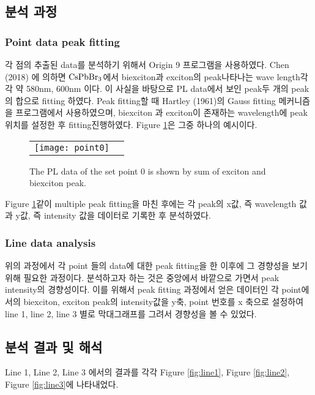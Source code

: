 \subsection{분석 과정}
\subsubsection{Point data peak fitting}
각 점의 추출된 data를 분석하기 위해서 Origin 9 프로그램을 사용하였다. Chen (2018) 에 의하면 $\rm CsPbBr_3$에서 biexciton과 exciton의 peak\이 나타나는 wave length\는 각각 약 580nm, 600nm 이다\cite{chen2018room}. 이 사실을 바탕으로 PL data에서 보인 peak\을 두 개의 peak의 합으로 fitting 하였다. Peak fitting\을 할 때 Hartley (1961)의 Gauss fitting 메커니즘을 프로그램에서 사용하였으며, biexciton 과 exciton이 존재하는 wavelength에 peak 위치를 설정한 후 fitting\을 진행하였다\cite{hartley1961modified}. Figure \ref{fig:point0}은 그중 하나의 예시이다.

\begin{figure}[H]
	\begin{center}
		\begin{tabular}{cc}
			\texttt{[image: point0]}
		\end{tabular}
	\end{center}
	\caption{The PL data of the set point 0 is shown by sum of exciton and biexciton peak.}
	\label{fig:point0}  
\end{figure}

Figure \ref{fig:point0}\과 같이 multiple peak fitting을 마친 후에는 각 peak의 x값, 즉 wavelength 값과 y값, 즉 intensity 값을 데이터로 기록한 후 분석하였다.

\subsubsection{Line data analysis}
위의 과정에서 각 point 들의 data에 대한 peak fitting을 한 이후에 그 경향성을 보기 위해 필요한 과정이다. 분석하고자 하는 것은 중앙에서 바깥으로 가면서 peak intensity의 경향성이다. 이를 위해서 peak fitting 과정에서 얻은 데이터인 각 point에서의 biexciton, exciton peak의 intensity값을 y축, point 번호를 x 축으로 설정하여  line 1, line 2, line 3 별로 막대그래프를 그려서 경향성을 볼 수 있었다.
\\

\subsection{분석 결과 및 해석}
Line 1, Line 2, Line 3 에서의 결과를 각각 Figure \ref{fig:line1}, Figure \ref{fig:line2}, Figure \ref{fig:line3}에 나타내었다.

